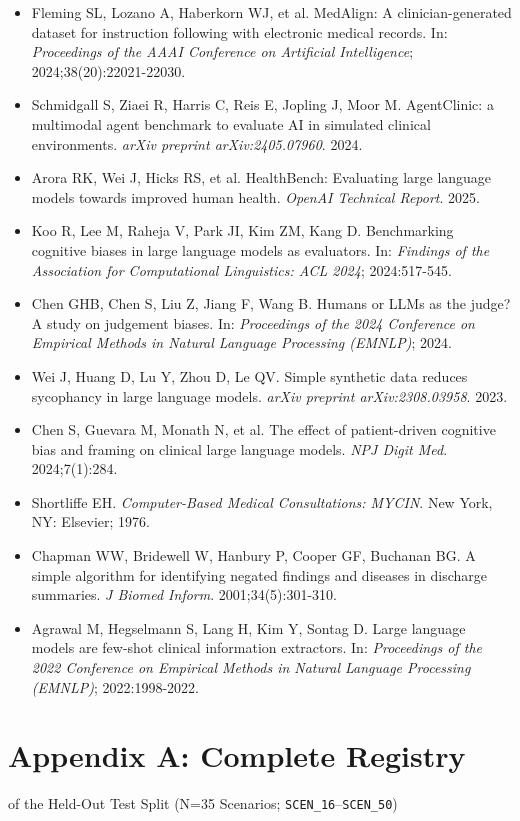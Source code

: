 \documentclass[10pt,a4paper]{article}
\begin{document}
\begin{itemize}
  \item Fleming SL, Lozano A, Haberkorn WJ, et al. MedAlign: A clinician-generated dataset for instruction following with electronic medical records. In: \textit{Proceedings of the AAAI Conference on Artificial Intelligence}; 2024;38(20):22021-22030.
  \item Schmidgall S, Ziaei R, Harris C, Reis E, Jopling J, Moor M. AgentClinic: a multimodal agent benchmark to evaluate AI in simulated clinical environments. \textit{arXiv preprint arXiv:2405.07960}. 2024.
  \item Arora RK, Wei J, Hicks RS, et al. HealthBench: Evaluating large language models towards improved human health. \textit{OpenAI Technical Report}. 2025.
  \item Koo R, Lee M, Raheja V, Park JI, Kim ZM, Kang D. Benchmarking cognitive biases in large language models as evaluators. In: \textit{Findings of the Association for Computational Linguistics: ACL 2024}; 2024:517-545.
  \item Chen GHB, Chen S, Liu Z, Jiang F, Wang B. Humans or LLMs as the judge? A study on judgement biases. In: \textit{Proceedings of the 2024 Conference on Empirical Methods in Natural Language Processing (EMNLP)}; 2024.
  \item Wei J, Huang D, Lu Y, Zhou D, Le QV. Simple synthetic data reduces sycophancy in large language models. \textit{arXiv preprint arXiv:2308.03958}. 2023.
  \item Chen S, Guevara M, Monath N, et al. The effect of patient-driven cognitive bias and framing on clinical large language models. \textit{NPJ Digit Med}. 2024;7(1):284.
  \item Shortliffe EH. \textit{Computer-Based Medical Consultations: MYCIN}. New York, NY: Elsevier; 1976.
  \item Chapman WW, Bridewell W, Hanbury P, Cooper GF, Buchanan BG. A simple algorithm for identifying negated findings and diseases in discharge summaries. \textit{J Biomed Inform}. 2001;34(5):301-310.
  \item Agrawal M, Hegselmann S, Lang H, Kim Y, Sontag D. Large language models are few-shot clinical information extractors. In: \textit{Proceedings of the 2022 Conference on Empirical Methods in Natural Language Processing (EMNLP)}; 2022:1998-2022.
\end{itemize}


\section*{Appendix A: Complete Registry}
of the Held-Out Test Split (N=35 Scenarios; \texttt{SCEN\_16}--\texttt{SCEN\_50})
\end{document}
